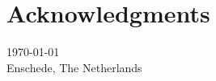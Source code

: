 \chapter*{Acknowledgments}\label{acknowledgments}%

\vspace{20pt}
\begin{flushright}
\today \\
Enschede, The Netherlands \\
\end{flushright}

